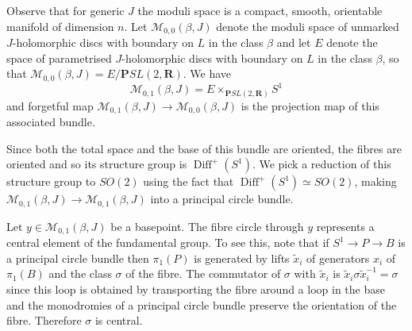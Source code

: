\documentclass{amsart}
\newcommand{\mM}{\mathcal{M}}
\newcommand{\RR}{\mathbf{R}}
\newcommand{\OP}{\operatorname}
\begin{document}
Observe that for generic $J$ the moduli space is a compact, smooth, orientable manifold of dimension $n$. Let $\mM_{0,0}(\beta,J)$ denote the moduli space of unmarked $J$-holomorphic discs with boundary on $L$ in the class $\beta$ and let $E$ denote the space of parametrised $J$-holomorphic discs with boundary on $L$ in the class $\beta$, so that $\mM_{0,0}(\beta,J)=E/\mathbf{P}SL(2,\RR)$. We have
\[\mM_{0,1}(\beta,J)=E\times_{\mathbf{P}SL(2,\RR)} S^1\]
and forgetful map $\mM_{0,1}(\beta,J)\to\mM_{0,0}(\beta,J)$ is the projection map of this associated bundle.

Since both the total space and the base of this bundle are oriented, the fibres are oriented and so its structure group is $\OP{Diff}^+(S^1)$. We pick a reduction of this structure group to $SO(2)$ using the fact that $\OP{Diff}^+(S^1)\simeq SO(2)$, making $\mM_{0,1}(\beta,J)\to\mM_{0,1}(\beta,J)$ into a principal circle bundle.

Let $y\in\mM_{0,1}(\beta,J)$ be a basepoint. The fibre circle through $y$ represents a central element of the fundamental group. To see this, note that if $S^1\to P\to B$ is a principal circle bundle then $\pi_1(P)$ is generated by lifts $\tilde{x}_i$ of generators $x_i$ of $\pi_1(B)$ and the class $\sigma$ of the fibre. The commutator of $\sigma$ with $\tilde{x}_i$ is $\tilde{x}_i\sigma\tilde{x}_i^{-1}=\sigma$ since this loop is obtained by transporting the fibre around a loop in the base and the monodromies of a principal circle bundle preserve the orientation of the fibre. Therefore $\sigma$ is central.
\end{document}
